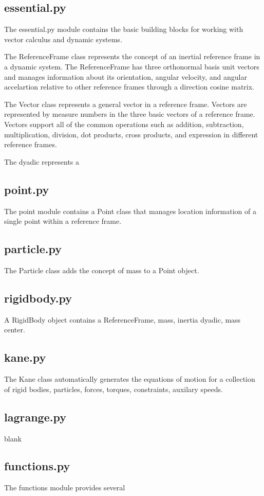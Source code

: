 \documentclass[twocolumn,10pt]{asme2e}
\begin{document}
\subsection*{essential.py}
The essential.py module contains the basic building blocks for working with
vector calculus and dynamic systems.

The ReferenceFrame class represents the concept of an inertial reference frame
in a dynamic system. The ReferenceFrame has three orthonormal basis unit
vectors and manages information about its orientation, angular velocity, and
angular accelartion relative to other reference frames through a direction
cosine matrix.

The Vector class represents a general vector in a reference frame. Vectors are
represented by measure numbers in the three basic vectors of a reference frame.
Vectors support all of the common operations such as addition, subtraction,
multiplication, division, dot products, cross products, and expression in
different reference frames.

The dyadic represents a
\subsection*{point.py}
The point module contains a Point class that manages location information of a
single point within a reference frame.
\subsection*{particle.py}
The Particle class adds the concept of mass to a Point object.
\subsection*{rigidbody.py}
A RigidBody object contains a ReferenceFrame, mass, inertia dyadic, mass
center.
\subsection*{kane.py}
The Kane class automatically generates the equations of motion for a collection
of rigid bodies, particles, forces, torques, constraints, auxilary speeds.
\subsection*{lagrange.py}
blank
\subsection*{functions.py}
The functions module provides several
\end{document}
